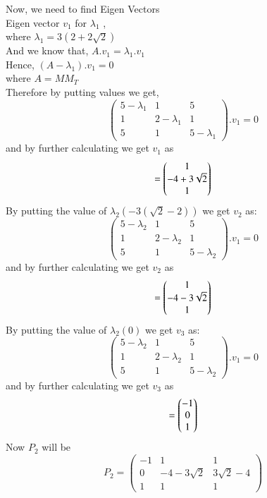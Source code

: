 \documentclass[journal,12pt,twocolumn]{IEEEtran}
\renewcommand\thesection{\arabic{section}}
\begin{document}
\begin{enumerate}[label=\thesection.\arabic*.,ref=\thesection.\theenumi]
Now, we need to find Eigen Vectors\\
Eigen vector $v_1$ for $\lambda_1$ ,\\
where $\lambda_1 =3(2+2\sqrt{2})$\\
And we know that,
$A.v_1 = \lambda_1.v_1$\\
Hence, $(A-\lambda_1).v_1=0$\\
where $A=MM_T $\\
Therefore by putting values we get,\\
$$
\begin{pmatrix}
5-\lambda_1 & 1 & 5\\
1 & 2-\lambda_1 & 1\\
5 & 1 & 5-\lambda_1
\end{pmatrix}
.v_1=0
$$
and by further calculating we get $v_1$ as\\
\begin{align*}
=\begin{pmatrix}1\\-4+3\sqrt{2}\\1\end{pmatrix}
\end{align*}
By putting the value of $\lambda_2(-3(\sqrt{2}-2)) $ we get $v_2$ as:
$$
\begin{pmatrix}
5-\lambda_2 & 1 & 5\\
1 & 2-\lambda_2 & 1\\
5 & 1 & 5-\lambda_2
\end{pmatrix}
.v_1=0
$$
and by further calculating we get $v_2$ as\\
\begin{align*}
=\begin{pmatrix}1\\-4-3\sqrt{2}\\1\end{pmatrix}
\end{align*}
By putting the value of $\lambda_2(0) $ we get $v_3$ as:
$$
\begin{pmatrix}
5-\lambda_2 & 1 & 5\\
1 & 2-\lambda_2 & 1\\
5 & 1 & 5-\lambda_2
\end{pmatrix}
.v_1=0
$$
and by further calculating we get $v_3$ as\\
\begin{align*}
=\begin{pmatrix}-1\\0\\1\end{pmatrix}
\end{align*}
Now $P_2$ will be
$$
P_2=\begin{pmatrix}
-1 &1& 1\\
0 & -4-3\sqrt{2} & 3\sqrt{2}-4\\
1 & 1 & 1
\end{pmatrix} 
$$
\end{enumerate}
\end{document}
